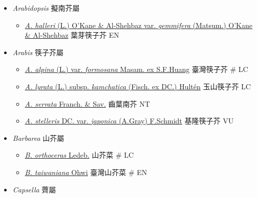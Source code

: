 
  \begin{itemize}
 \item[] \textit{Arabidopsis} 擬南芥屬
                                
  \begin{itemize}
        \item[] \href{http://www.theplantlist.org/tpl1.1/search?q=Arabidopsis+halleri+var.+gemmifera}{\textit{A. halleri} (L.) O'Kane \& Al-Shehbaz var. \textit{gemmifera} (Matsum.) O'Kane \& Al-Shehbaz}   葉芽筷子芥   EN
  \end{itemize}
 \item[] \textit{Arabis} 筷子芥屬
                                
  \begin{itemize}
        \item[] \href{http://www.theplantlist.org/tpl1.1/search?q=Arabis+alpina+var.+formosana}{\textit{A. alpina} (L.) var. \textit{formosana} Masam. ex S.F.Huang}   臺灣筷子芥  \# LC
        \item[] \href{http://www.theplantlist.org/tpl1.1/search?q=Arabis+lyrata+subsp.+kamchatica}{\textit{A. lyrata} (L.) subsp. \textit{kamchatica} (Fisch. ex DC.) Hultén}   玉山筷子芥   LC
        \item[] \href{http://www.theplantlist.org/tpl1.1/search?q=Arabis+serrata}{\textit{A. serrata} Franch. \& Sav.}   齒葉南芥   NT
        \item[] \href{http://www.theplantlist.org/tpl1.1/search?q=Arabis+stelleris+var.+japonica}{\textit{A. stelleris} DC. var. \textit{japonica} (A.Gray) F.Schmidt}   基隆筷子芥   VU
  \end{itemize}
 \item[] \textit{Barbarea} 山芥屬
                                
  \begin{itemize}
        \item[] \href{http://www.theplantlist.org/tpl1.1/search?q=Barbarea+orthoceras}{\textit{B. orthoceras} Ledeb.}   山芥菜  \# LC
        \item[] \href{http://www.theplantlist.org/tpl1.1/search?q=Barbarea+taiwaniana}{\textit{B. taiwaniana} Ohwi}   臺灣山芥菜  \# EN
  \end{itemize}
 \item[] \textit{Capsella} 薺屬
                                

\end{itemize}
